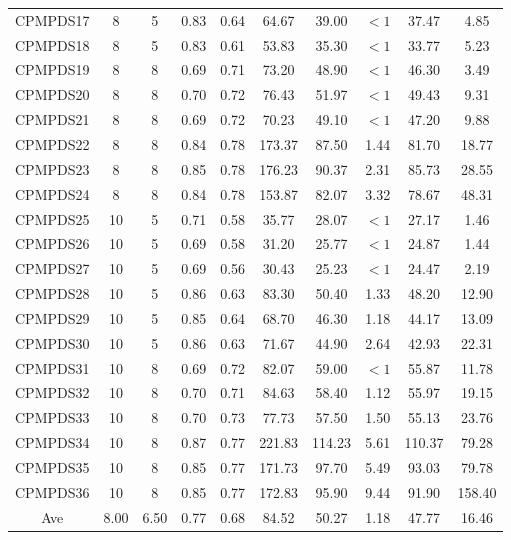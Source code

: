 \documentclass[review,3p,times,authoryear,12pt]{elsarticle}
\begin{document}
\begin{table}[!htb]
\begin{tabular}{c|c|c|c|c|c|c|c|c|c}
    CPMPDS17 & 8     & 5     & 0.83  & 0.64  & 64.67   & 39.00  & $<1$    & 37.47  & 4.85  \\
    CPMPDS18 & 8     & 5     & 0.83  & 0.61  & 53.83   & 35.30  & $<1$    & 33.77  & 5.23  \\
    CPMPDS19 & 8     & 8     & 0.69  & 0.71  & 73.20   & 48.90  & $<1$    & 46.30  & 3.49  \\
    CPMPDS20 & 8     & 8     & 0.70  & 0.72  & 76.43   & 51.97  & $<1$    & 49.43  & 9.31  \\
    CPMPDS21 & 8     & 8     & 0.69  & 0.72  & 70.23   & 49.10  & $<1$    & 47.20  & 9.88  \\
    CPMPDS22 & 8     & 8     & 0.84  & 0.78  & 173.37  & 87.50  & 1.44    & 81.70  & 18.77  \\
    CPMPDS23 & 8     & 8     & 0.85  & 0.78  & 176.23  & 90.37  & 2.31    & 85.73  & 28.55  \\
    CPMPDS24 & 8     & 8     & 0.84  & 0.78  & 153.87  & 82.07  & 3.32    & 78.67  & 48.31  \\
    CPMPDS25 & 10    & 5     & 0.71  & 0.58  & 35.77   & 28.07  & $<1$    & 27.17  & 1.46  \\
    CPMPDS26 & 10    & 5     & 0.69  & 0.58  & 31.20   & 25.77  & $<1$    & 24.87  & 1.44  \\
    CPMPDS27 & 10    & 5     & 0.69  & 0.56  & 30.43   & 25.23  & $<1$    & 24.47  & 2.19  \\
    CPMPDS28 & 10    & 5     & 0.86  & 0.63  & 83.30   & 50.40  & 1.33    & 48.20  & 12.90  \\
    CPMPDS29 & 10    & 5     & 0.85  & 0.64  & 68.70   & 46.30  & 1.18    & 44.17  & 13.09  \\
    CPMPDS30 & 10    & 5     & 0.86  & 0.63  & 71.67   & 44.90  & 2.64    & 42.93  & 22.31  \\
    CPMPDS31 & 10    & 8     & 0.69  & 0.72  & 82.07   & 59.00  & $<1$    & 55.87  & 11.78  \\
    CPMPDS32 & 10    & 8     & 0.70  & 0.71  & 84.63   & 58.40  & 1.12    & 55.97  & 19.15  \\
    CPMPDS33 & 10    & 8     & 0.70  & 0.73  & 77.73   & 57.50  & 1.50    & 55.13  & 23.76  \\
    CPMPDS34 & 10    & 8     & 0.87  & 0.77  & 221.83  & 114.23 & 5.61    & 110.37 & 79.28  \\
    CPMPDS35 & 10    & 8     & 0.85  & 0.77  & 171.73  & 97.70  & 5.49    & 93.03  & 79.78  \\
    CPMPDS36 & 10    & 8     & 0.85  & 0.77  & 172.83  & 95.90  & 9.44    & 91.90  & 158.40  \\
    \hline
    Ave      & 8.00  & 6.50  & 0.77  & 0.68  & 84.52   & 50.27  & 1.18    & 47.77  & 16.46  \\
    \hline
\end{tabular}
\end{table}%
\end{document}
